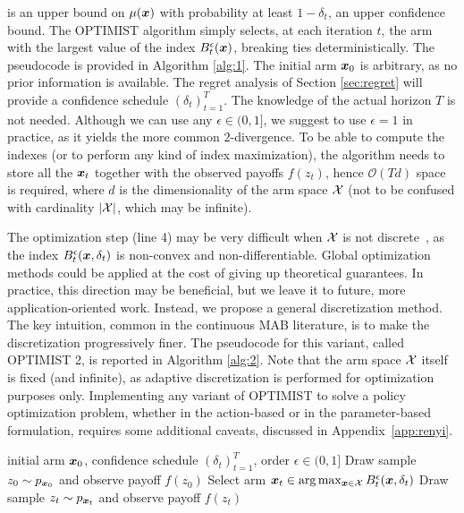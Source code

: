 \documentclass{article}
\makeatletter
\DeclareRobustCommand{\algoname}{OPTIMIST\@\xspace}
\makeatother
\begin{document}
is an upper bound on $\mu(\boldsymbol{x})$ with probability at least $1-\delta_t$, \ie an upper confidence bound. The \algoname algorithm simply selects, at each iteration $t$, the arm with the largest value of the index $B_t^{\epsilon}(\boldsymbol{x})$, breaking ties deterministically. The pseudocode is provided in Algorithm \ref{alg:1}. The initial arm $\boldsymbol{x}_0$ is arbitrary, as no prior information is available. The regret analysis of Section \ref{sec:regret} will provide a confidence schedule $(\delta_t)_{t=1}^T$. The knowledge of the actual horizon $T$ is not needed. Although we can use any $\epsilon\in (0,1]$, we suggest to use $\epsilon=1$ in practice, as it yields the more common $2$-\Renyi divergence. To be able to compute the indexes (or to perform any kind of index maximization), the algorithm needs to store all the $\boldsymbol{x}_t$ together with the observed payoffs $f(z_t)$, hence $\mathcal{O}(Td)$ space is required, where $d$ is the dimensionality of the arm space $\mathcal{X}$ (not to be confused with cardinality $|\mathcal{X}|$, which may be infinite). 

The optimization step (line 4) may be very difficult when $\mathcal{X}$ is not discrete~\citep[\cf][]{srinivas2010gaussian}, as the index $B_t^{\epsilon}(\boldsymbol{x},\delta_t)$ is non-convex and non-differentiable. Global optimization methods could be applied at the cost of giving up theoretical guarantees. In practice, this direction may be beneficial, but we leave it to future, more application-oriented work. Instead, we propose a general discretization method. The key intuition, common in the continuous MAB literature, is to make the discretization progressively finer. The pseudocode for this variant, called \algoname2, is reported in Algorithm \ref{alg:2}. Note that the arm space $\mathcal{X}$ itself is fixed (and infinite), as adaptive discretization is performed for optimization purposes only. 
Implementing any variant of \algoname to solve a policy optimization problem, whether in the action-based or in the parameter-based formulation, requires some additional caveats, discussed in Appendix~\ref{app:renyi}.

\begin{algorithm}[t]
	\caption{\algoname}
	\label{alg:1}
	\begin{algorithmic}[1]
	 initial arm $\boldsymbol{x}_0$, confidence schedule $(\delta_t)_{t=1}^T$, order ${\epsilon\in(0,1]}$
	\STATE Draw sample $z_0\sim p_{\boldsymbol{x}_0}$ and observe payoff $f(z_0)$
		\STATE Select arm $\boldsymbol{x}_t \in \arg\max_{\boldsymbol{x}\in\mathcal{X}}B_t^{\epsilon}(\boldsymbol{x},\delta_t)$
		\STATE Draw sample $z_t\sim p_{\boldsymbol{x}_t}$ and observe payoff $f(z_t)$
	\ENDFOR
	\end{algorithmic}
\end{algorithm}
\end{document}
